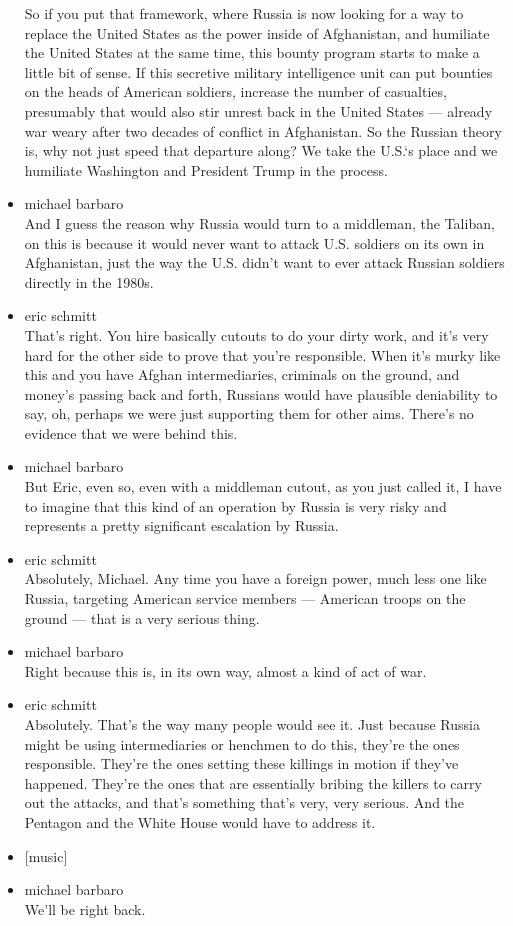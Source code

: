 \begin{itemize}
  So if you put that framework, where Russia is now looking for a way to
  replace the United States as the power inside of Afghanistan, and
  humiliate the United States at the same time, this bounty program
  starts to make a little bit of sense. If this secretive military
  intelligence unit can put bounties on the heads of American soldiers,
  increase the number of casualties, presumably that would also stir
  unrest back in the United States --- already war weary after two
  decades of conflict in Afghanistan. So the Russian theory is, why not
  just speed that departure along? We take the U.S.`s place and we
  humiliate Washington and President Trump in the process.
\item
  michael barbaro\\
  And I guess the reason why Russia would turn to a middleman, the
  Taliban, on this is because it would never want to attack U.S.
  soldiers on its own in Afghanistan, just the way the U.S. didn't want
  to ever attack Russian soldiers directly in the 1980s.
\item
  eric schmitt\\
  That's right. You hire basically cutouts to do your dirty work, and
  it's very hard for the other side to prove that you're responsible.
  When it's murky like this and you have Afghan intermediaries,
  criminals on the ground, and money's passing back and forth, Russians
  would have plausible deniability to say, oh, perhaps we were just
  supporting them for other aims. There's no evidence that we were
  behind this.
\item
  michael barbaro\\
  But Eric, even so, even with a middleman cutout, as you just called
  it, I have to imagine that this kind of an operation by Russia is very
  risky and represents a pretty significant escalation by Russia.
\item
  eric schmitt\\
  Absolutely, Michael. Any time you have a foreign power, much less one
  like Russia, targeting American service members --- American troops on
  the ground --- that is a very serious thing.
\item
  michael barbaro\\
  Right because this is, in its own way, almost a kind of act of war.
\item
  eric schmitt\\
  Absolutely. That's the way many people would see it. Just because
  Russia might be using intermediaries or henchmen to do this, they're
  the ones responsible. They're the ones setting these killings in
  motion if they've happened. They're the ones that are essentially
  bribing the killers to carry out the attacks, and that's something
  that's very, very serious. And the Pentagon and the White House would
  have to address it.
\item
  {[}music{]}
\item
  michael barbaro\\
  We'll be right back.


\end{itemize}
